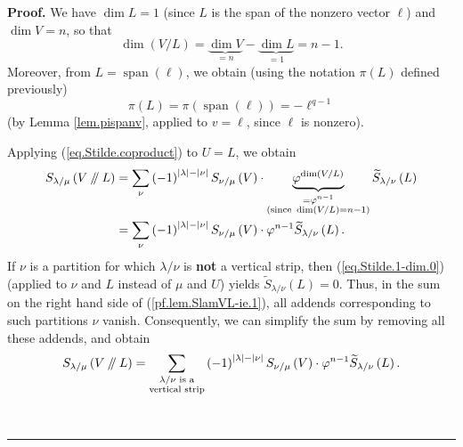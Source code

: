 \documentclass[numbers=enddot,12pt,final,onecolumn,notitlepage]{scrartcl}%
\numberwithin{exer}{section}
\theoremstyle{definition}
\newenvironment{proof}[1][Proof]{\noindent\textbf{#1.} }{\ \rule{0.5em}{0.5em}}
\let\sumnonlimits\sum
\renewcommand{\sum}{\sumnonlimits\limits}
\newcommand{\sslash}{\mathbin{/\mkern-5mu/}}
\theoremstyle{plainsl}
\begin{document}
\begin{proof}
We have $\dim L=1$ (since $L$ is the span of the nonzero vector $\ell$) and
$\dim V=n$, so that
\[
\dim\left(  V/L\right)  =\underbrace{\dim V}_{=n}-\underbrace{\dim L}%
_{=1}=n-1.
\]
Moreover, from $L=\operatorname*{span}\left(  \ell\right)  $, we obtain (using
the notation $\pi\left(  L\right)  $ defined previously)%
\begin{equation}
\pi\left(  L\right)  =\pi\left(  \operatorname*{span}\left(  \ell\right)
\right)  =-\ell^{q-1} \label{pf.lem.SlamVL-ie.piL}%
\end{equation}
(by Lemma \ref{lem.pispanv}, applied to $v=\ell$, since $\ell$ is nonzero).

Applying (\ref{eq.Stilde.coproduct}) to $U=L$, we obtain%
\begin{align}
S_{\lambda/\mu}\left(  V\sslash L\right)   &  =\sum_{\nu}\left(  -1\right)
^{\left\vert \lambda\right\vert -\left\vert \nu\right\vert }S_{\nu/\mu}\left(
V\right)  \cdot\underbrace{\varphi^{\dim\left(  V/L\right)  }}%
_{\substack{=\varphi^{n-1}\\\text{(since }\dim\left(  V/L\right)
=n-1\text{)}}}\widetilde{S}_{\lambda/\nu}\left(  L\right) \nonumber\\
&  =\sum_{\nu}\left(  -1\right)  ^{\left\vert \lambda\right\vert -\left\vert
\nu\right\vert }S_{\nu/\mu}\left(  V\right)  \cdot\varphi^{n-1}\widetilde{S}%
_{\lambda/\nu}\left(  L\right)  . \label{pf.lem.SlamVL-ie.1}%
\end{align}
If $\nu$ is a partition for which $\lambda/\nu$ is \textbf{not} a vertical
strip, then (\ref{eq.Stilde.1-dim.0}) (applied to $\nu$ and $L$ instead of
$\mu$ and $U$) yields $\widetilde{S}_{\lambda/\nu}\left(  L\right)  =0$. Thus,
in the sum on the right hand side of (\ref{pf.lem.SlamVL-ie.1}), all addends
corresponding to such partitions $\nu$ vanish. Consequently, we can simplify
the sum by removing all these addends, and obtain%
\begin{equation}
S_{\lambda/\mu}\left(  V\sslash L\right)  =\sum_{\substack{\lambda/\nu\text{
is a}\\\text{vertical strip}}}\left(  -1\right)  ^{\left\vert \lambda
\right\vert -\left\vert \nu\right\vert }S_{\nu/\mu}\left(  V\right)
\cdot\varphi^{n-1}\widetilde{S}_{\lambda/\nu}\left(  L\right)  .
\label{pf.lem.SlamVL-ie.2}%
\end{equation}



\end{proof}
\end{document}
